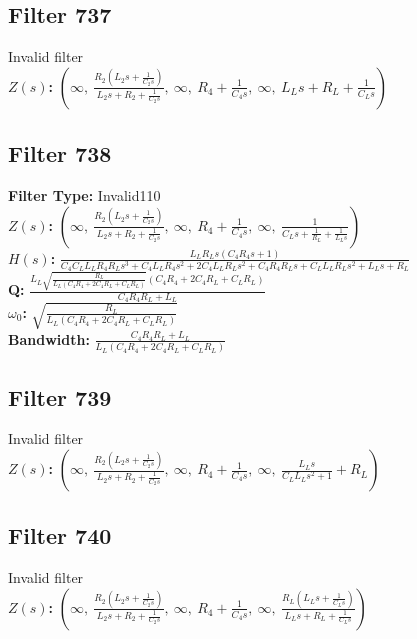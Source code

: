 \documentclass{article}
\begin{document}
\subsection*{Filter 737}
Invalid filter \\ 
\textbf{$Z(s)$:} $\left( \infty, \  \frac{R_{2} \left(L_{2} s + \frac{1}{C_{2} s}\right)}{L_{2} s + R_{2} + \frac{1}{C_{2} s}}, \  \infty, \  R_{4} + \frac{1}{C_{4} s}, \  \infty, \  L_{L} s + R_{L} + \frac{1}{C_{L} s}\right)$ \\ 
\subsection*{Filter 738}
\textbf{Filter Type:} Invalid110 \\ 
\textbf{$Z(s)$:} $\left( \infty, \  \frac{R_{2} \left(L_{2} s + \frac{1}{C_{2} s}\right)}{L_{2} s + R_{2} + \frac{1}{C_{2} s}}, \  \infty, \  R_{4} + \frac{1}{C_{4} s}, \  \infty, \  \frac{1}{C_{L} s + \frac{1}{R_{L}} + \frac{1}{L_{L} s}}\right)$ \\ 
\textbf{$H(s)$:} $\frac{L_{L} R_{L} s \left(C_{4} R_{4} s + 1\right)}{C_{4} C_{L} L_{L} R_{4} R_{L} s^{3} + C_{4} L_{L} R_{4} s^{2} + 2 C_{4} L_{L} R_{L} s^{2} + C_{4} R_{4} R_{L} s + C_{L} L_{L} R_{L} s^{2} + L_{L} s + R_{L}}$ \\ 
\textbf{Q:} $\frac{L_{L} \sqrt{\frac{R_{L}}{L_{L} \left(C_{4} R_{4} + 2 C_{4} R_{L} + C_{L} R_{L}\right)}} \left(C_{4} R_{4} + 2 C_{4} R_{L} + C_{L} R_{L}\right)}{C_{4} R_{4} R_{L} + L_{L}}$ \\ 
\textbf{$\omega_0$:} $\sqrt{\frac{R_{L}}{L_{L} \left(C_{4} R_{4} + 2 C_{4} R_{L} + C_{L} R_{L}\right)}}$ \\ 
\textbf{Bandwidth:} $\frac{C_{4} R_{4} R_{L} + L_{L}}{L_{L} \left(C_{4} R_{4} + 2 C_{4} R_{L} + C_{L} R_{L}\right)}$ \\ 
\subsection*{Filter 739}
Invalid filter \\ 
\textbf{$Z(s)$:} $\left( \infty, \  \frac{R_{2} \left(L_{2} s + \frac{1}{C_{2} s}\right)}{L_{2} s + R_{2} + \frac{1}{C_{2} s}}, \  \infty, \  R_{4} + \frac{1}{C_{4} s}, \  \infty, \  \frac{L_{L} s}{C_{L} L_{L} s^{2} + 1} + R_{L}\right)$ \\ 
\subsection*{Filter 740}
Invalid filter \\ 
\textbf{$Z(s)$:} $\left( \infty, \  \frac{R_{2} \left(L_{2} s + \frac{1}{C_{2} s}\right)}{L_{2} s + R_{2} + \frac{1}{C_{2} s}}, \  \infty, \  R_{4} + \frac{1}{C_{4} s}, \  \infty, \  \frac{R_{L} \left(L_{L} s + \frac{1}{C_{L} s}\right)}{L_{L} s + R_{L} + \frac{1}{C_{L} s}}\right)$ \\ 
\end{document}
